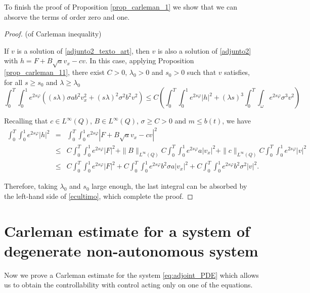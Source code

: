 \documentclass[11pt,oneside,a4papper]{osajnl}
\begin{document}


To finish the proof of Proposition \ref{prop_carleman_1} we show that we can absorve the terms of order zero and one. 

\begin{proof} (of Carleman inequality)
    
If $v$ is a solution of \eqref{adjunto2_texto_art}, then $v$ is also a solution of \eqref{adjunto2} with $h = F + B\sqrt{a} v_x -c v$. In this case, applying Proposition \ref{prop_carleman_11}, there exist $C > 0$, $\lambda_0 > 0$ and $s_0 > 0$ such that $v$ satisfies, for all $s \geq s_0$ and $\lambda\geq \lambda_0$
	\begin{equation}\label{ecultimo}
	\int_{0}^{T}\int_{0}^{1}e^{2s\varphi}\left(  (s\lambda)\sigma a b^2 v_x^2+(s\lambda)^2\sigma^2b^2 v^2 \right)\leq C\left(	\int_{0}^{T}\int_{0}^{1} e^{2s\varphi} |h|^2+(\lambda s)^3\int_{0}^{T}\int_{\omega}e^{2s\varphi} \sigma^3  v^2  \right)
\end{equation}

Recalling that $c\in L^\infty(Q)$, $B\in L^\infty(Q)$, $\sigma \geq C > 0$ and $m\leq b(t)$, we have
\begin{eqnarray*}
	\int_{0}^{T}\int_{0}^{1} e^{2s\varphi} |h|^2&=&\int_{0}^{T}\int_{0}^{1} e^{2s\varphi} |F+B\sqrt{a} v_x -cv|^2\\
	&\leq &C\int_{0}^{T}\int_{0}^{1} e^{2s\varphi}|F|^2+\|B\|_{L^\infty(Q)}C\int_{0}^{T}\int_{0}^{1} e^{2s\varphi}a|v_x|^2+\|c\|_{L^\infty(Q)}C\int_{0}^{T}\int_{0}^{1} e^{2s\varphi}|v|^2\\
		&\leq &C\int_{0}^{T}\int_{0}^{1} e^{2s\varphi}|F|^2+C\int_{0}^{T}\int_{0}^{1} e^{2s\varphi}b^2\sigma a|v_x|^2+C\int_{0}^{T}\int_{0}^{1} e^{2s\varphi}b^2\sigma^2 |v|^2.
\end{eqnarray*}

Therefore, taking $\lambda_0$ and $s_0$ large enough, the last integral can be absorbed by the left-hand side of \eqref{ecultimo}, which complete the proof.

\end{proof}

\section{Carleman estimate for a system of degenerate non-autonomous system}
\label{sec:carleman_system_nonautonomous}

Now we prove a Carleman estimate for the system \eqref{eq:adjoint_PDE} which allows us to obtain the controllability with control acting only on one of the equations. 
\end{document}
